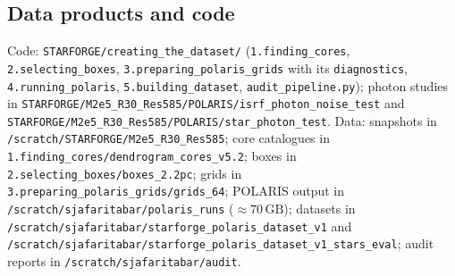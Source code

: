 \subsection{Data products and code}
\label{sec:dataset:files}

Code: \texttt{STARFORGE/creating\_the\_dataset/} (\texttt{1.finding\_cores}, \texttt{2.selecting\_boxes},
\texttt{3.preparing\_polaris\_grids} with its \texttt{diagnostics}, \texttt{4.running\_polaris},
\texttt{5.building\_dataset}, \texttt{audit\_pipeline.py}); photon studies in
\texttt{STARFORGE/M2e5\_R30\_Res585/POLARIS/isrf\_photon\_noise\_test} and \texttt{STARFORGE/M2e5\_R30\_Res585/POLARIS/star\_photon\_test}.
Data: snapshots in \texttt{/scratch/STARFORGE/M2e5\_R30\_Res585}; core catalogues in
\texttt{1.finding\_cores/dendrogram\_cores\_v5.2}; boxes in \texttt{2.selecting\_boxes/boxes\_2.2pc};
grids in \texttt{3.preparing\_polaris\_grids/grids\_64}; POLARIS output in
\texttt{/scratch/sjafaritabar/polaris\_runs} ($\approx70\,\mathrm{GB}$); datasets in
\texttt{/scratch/sjafaritabar/starforge\_polaris\_dataset\_v1} and
\texttt{/scratch/sjafaritabar/starforge\_polaris\_dataset\_v1\_stars\_eval}; audit reports in
\texttt{/scratch/sjafaritabar/audit}.
